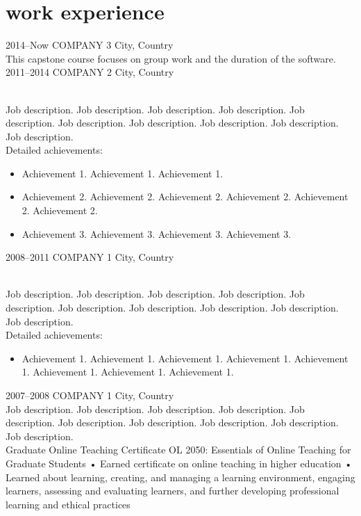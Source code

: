 \documentclass[]{cv-style}          %
\begin{document}
\section{work experience}
\begin{entrylist}
\entry
  {2014--Now}
  {COMPANY 3}
  {City, Country}
  {\\
This capstone course focuses on group work and the duration of the software.}
\entry
  {2011--2014}
  {COMPANY 2}
  {City, Country}
  {\\
  Job description. Job description. Job description. Job description. Job description. Job description. Job description. Job description. Job description. Job description.\\
  Detailed achievements:
  \begin{itemize}
    \item Achievement 1. Achievement 1. Achievement 1. 
    \item Achievement 2. Achievement 2. Achievement 2. Achievement 2. Achievement 2. Achievement 2.
    \item Achievement 3. Achievement 3. Achievement 3. Achievement 3.  
  \end{itemize}}
\entry
  {2008--2011}
  {COMPANY 1}
  {City, Country}
  {\\
  Job description. Job description. Job description. Job description. Job description. Job description. Job description. Job description. Job description. Job description.\\
  Detailed achievements:
  \begin{itemize}
    \item Achievement 1. Achievement 1. Achievement 1. Achievement 1. Achievement 1. Achievement 1. Achievement 1. Achievement 1. 
  \end{itemize}}
\entry
  {2007--2008}
  {COMPANY 1}
  {City, Country}
  {\\
  Job description. Job description. Job description. Job description. Job description. Job description. Job description. Job description. Job description. Job description.\\}
Graduate Online Teaching Certificate
OL 2050: Essentials of Online Teaching for Graduate Students
• Earned certificate on online teaching in higher education
• Learned about learning, creating, and managing a learning environment,
engaging learners, assessing and evaluating learners, and further
developing professional learning and ethical practices
\end{entrylist}
\fi
\end{document}

